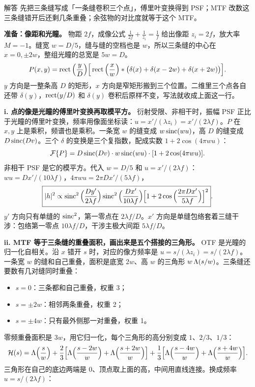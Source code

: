 \begin{exam}{解答}
先把三条缝写成「一条缝卷积三个点」，傅里叶变换得到 PSF；MTF 改数这三条缝错开后还剩几条重叠；余弦物的对比度就等于这个 MTF。

\textbf{准备：像距和光瞳。}
物距 $2f$，成像公式 $\frac1{2f}+\frac1{z_i}=\frac1f$ 给出像距 $z_i=2f$，放大率 $M=-1$。缝宽 $w=D/5$，缝与缝的空档也是 $w$，所以三条缝的中心在 $x=0,\pm2w$，整组光瞳的总宽是 $5w=D$。
\[
P(x,y)=\operatorname{rect}\Big(\frac yD\Big)\Big[\operatorname{rect}\Big(\frac xw\Big)\ast\big(\delta(x)+\delta(x-2w)+\delta(x+2w)\big)\Big].
\]
$y$ 方向是一整条高 $D$ 的矩形，$x$ 方向是窄矩形搬到三个位置。二维里三个点各自还带 $\delta(y)$，$\operatorname{rect}(y/D)$ 和 $\delta(y)$ 卷积后原样不变，写法就收成上面这一行。

\textbf{i. 点的像是光瞳的傅里叶变换再取模平方。}
衍射受限、非相干时，振幅 PSF 正比于光瞳的傅里叶变换，频率用像面坐标读：$u=x'/(\lambda z_i)=x'/(2\lambda f)$。$P$ 在 $x,y$ 上是乘积，频谱也是乘积。一条宽 $w$ 的缝变成 $w\operatorname{sinc}(wu)$，高 $D$ 的缝变成 $D\operatorname{sinc}(Dv)$。三个 $\delta$ 的变换是三个复指数，配成实数 $1+2\cos(4\pi wu)$：
\[
\mathcal{F}\{P\}=D\operatorname{sinc}(Dv)\cdot w\operatorname{sinc}(wu)\cdot[1+2\cos(4\pi wu)] .
\]
非相干 PSF 是它的模平方。代入 $w=D/5$ 和 $u=x'/(2\lambda f)$：$wu=Dx'/(10\lambda f)$，$4\pi wu=2\pi Dx'/(5\lambda f)$，
\[
\boxed{|h|^2\propto\operatorname{sinc}^2\Big(\frac{Dy'}{2\lambda f}\Big)\operatorname{sinc}^2\Big(\frac{Dx'}{10\lambda f}\Big)\Big[1+2\cos\Big(\frac{2\pi Dx'}{5\lambda f}\Big)\Big]^2} .
\]
$y'$ 方向只有单缝的 $\operatorname{sinc}^2$，第一零点在 $2\lambda f/D$。$x'$ 方向是单缝包络套着三缝干涉：包络第一零点 $10\lambda f/D$，干涉主极大间距 $5\lambda f/D$。

\textbf{ii. MTF 等于三条缝的重叠面积，画出来是五个搭接的三角形。}
OTF 是光瞳的归一化自相关。沿 $x$ 错开 $s$ 时，对应的像方频率是 $u=s/(\lambda z_i)=s/(2\lambda f)$。一条宽 $w$ 的缝和自己重叠，面积是底宽 $2w$、高 $w$ 的三角形 $w\,\Lambda(s/w)$。三条缝还要数有几对缝同时重叠：
\begin{itemize}
\item $s=0$：三条都和自己重叠，权重 3；
\item $s=\pm2w$：相邻两条重叠，权重 2；
\item $s=\pm4w$：只有最外侧那一对重叠，权重 1。
\end{itemize}
零频重叠面积是 $3w$，用它归一化，每个三角形的高分别变成 $1$、$2/3$、$1/3$：
\[
\mathcal H(s)=\Lambda\Big(\frac sw\Big)+\frac23\Big[\Lambda\Big(\frac{s-2w}w\Big)+\Lambda\Big(\frac{s+2w}w\Big)\Big]+\frac13\Big[\Lambda\Big(\frac{s-4w}w\Big)+\Lambda\Big(\frac{s+4w}w\Big)\Big].
\]
三角形在自己的底边两端是 0、顶点取上面的高，中间用直线连接。换成频率 $u=s/(2\lambda f)$：


\end{exam}
